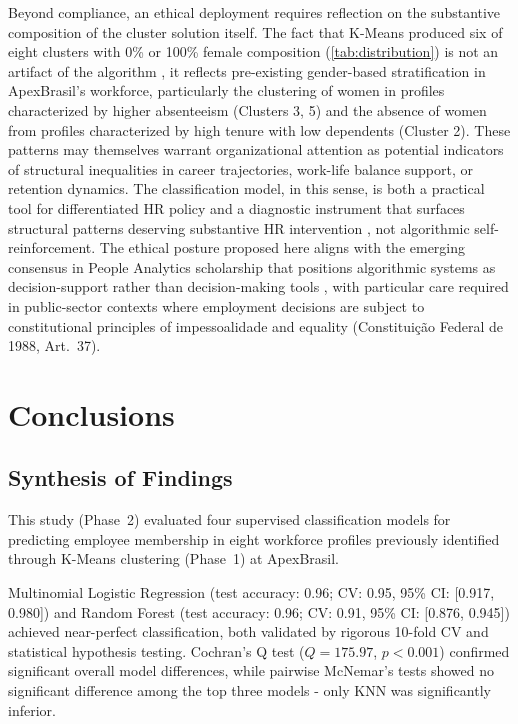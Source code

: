 \documentclass[alpha-refs,english]{RBCA_v3.0}
\begin{document}
Beyond compliance, an ethical deployment requires reflection on 
the substantive composition of the cluster solution itself. The 
fact that K-Means produced six of eight clusters with 0\% or 100\% 
female composition (\cref{tab:distribution}) is not an artifact of 
the algorithm , it reflects pre-existing gender-based 
stratification in ApexBrasil's workforce, particularly the 
clustering of women in profiles characterized by higher 
absenteeism (Clusters 3, 5) and the absence of women from 
profiles characterized by high tenure with low dependents 
(Cluster 2). These patterns may themselves warrant organizational 
attention as potential indicators of structural inequalities in 
career trajectories, work-life balance support, or retention 
dynamics. The classification model, in this sense, is both a 
practical tool for differentiated HR policy and a diagnostic 
instrument that surfaces structural patterns deserving 
substantive HR intervention , not algorithmic 
self-reinforcement. The ethical posture proposed here aligns 
with the emerging consensus in People Analytics scholarship that 
positions algorithmic systems as decision-support rather than 
decision-making tools \citep{Tursunbayeva2022,Polzer2022}, with 
particular care required in public-sector contexts where 
employment decisions are subject to constitutional principles of 
impessoalidade and equality (Constituição Federal de 1988, 
Art.~37).


\section{Conclusions}
\label{sec:conclusions}

\subsection{Synthesis of Findings}
This study (Phase~2) evaluated four supervised classification models for predicting employee membership in eight workforce profiles previously identified through K-Means clustering (Phase~1) at ApexBrasil.

Multinomial Logistic Regression (test accuracy: 0.96; CV: 0.95, 95\% CI: [0.917, 0.980]) and Random Forest (test accuracy: 0.96; CV: 0.91, 95\% CI: [0.876, 0.945]) achieved near-perfect classification, both validated by rigorous 10-fold CV and statistical hypothesis testing. Cochran's Q test ($Q = 175.97$, $p < 0.001$) confirmed significant overall model differences, while pairwise McNemar's tests showed no significant difference among the top three models - only KNN was significantly inferior.
\end{document}
